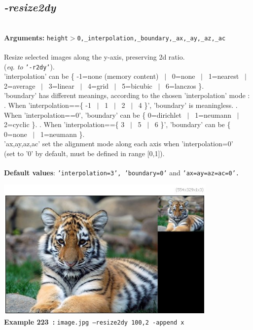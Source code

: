 \documentclass[a4paper,11pt,twoside]{book}
\begin{document}
\subsection{\emph{-resize2dy} }\vspace*{-0.5em}
~\\\textbf{Arguments: } 
{\small \texttt{height$>$0,\_interpolation,\_boundary,\_ax,\_ay,\_az,\_ac}}\\~\\
Resize selected images along the y-axis, preserving 2d ratio.
~\\(\emph{eq. to} {\small \texttt{'-r2dy'}}).
~\\'interpolation' can be \{ -1=none (memory content) ~$|$~ 0=none ~$|$~ 1=nearest ~$|$~ 2=average ~$|$~ 3=linear ~$|$~ 4=grid ~$|$~ 5=bicubic ~$|$~ 6=lanczos \}.
~\\'boundary' has different meanings, according to the chosen 'interpolation' mode :
. When 'interpolation==\{ -1 ~$|$~ 1 ~$|$~ 2 ~$|$~ 4 \}', 'boundary' is meaningless.
. When 'interpolation==0', 'boundary' can be \{ 0=dirichlet ~$|$~ 1=neumann ~$|$~ 2=cyclic \}.
. When 'interpolation==\{ 3 ~$|$~ 5 ~$|$~ 6 \}', 'boundary' can be \{ 0=none ~$|$~ 1=neumann \}.
~\\'ax,ay,az,ac' set the alignment mode along each axis when 'interpolation=0'
~\\(set to '0' by default, must be defined in range [0,1]).
~\\~\\\textbf{Default values}: {\small \texttt{'interpolation=3', 'boundary=0'} and \texttt{'ax=ay=az=ac=0'.}}
\begin{center}\includegraphics[keepaspectratio=true,height=7cm,width=\textwidth]{img/gmic_def223.jpg}\\
{\footnotesize \textbf{Example 223~:} \texttt{image.jpg --resize2dy 100,2 -append x}}
\end{center}
\end{document}
